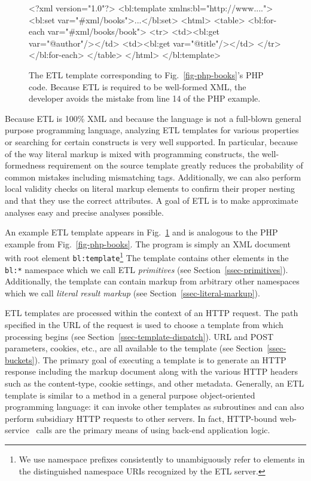 \documentclass{www2003-submission}
\newcommand{\smtexttt}[1]{{\small\texttt{#1}}}
\newcommand{\ns}[1]{{\small\texttt{#1:*}}}
\newcommand{\figref}[1]{Fig.~\ref{fig-#1}}
\newcommand{\ssecref}[1]{Section~\ref{ssec-#1}}
\begin{document}
\begin{figure}[tb]
\begin{listing}{1}
<?xml version="1.0"?>
<bl:template xmlns:bl="http://www....">
 <bl:set var="#xml/books">...</bl:set>
 <html>
  <table>
   <bl:for-each var="#xml/books/book">
    <tr> 
     <td><bl:get var="@author"/></td>
     <td><bl:get var="@title"/></td>
    </tr>
   </bl:for-each>
  </table>
 </html>
</bl:template>
\end{listing}%
\caption{The ETL template corresponding to \figref{php-books}'s PHP
code. Because ETL is required to be well-formed XML, the developer
avoids the mistake from line 14 of the PHP example.
\label{fig-etl-books}}
\end{figure}

Because ETL is 100\% XML and because the language is not a full-blown
general purpose programming language, analyzing ETL templates for
various properties or searching for certain constructs is very well
supported.  In particular, because of the way literal markup is mixed
with programming constructs, the well-formedness requirement on the
source template greatly reduces the probability of common mistakes
including mismatching tags.  Additionally, we can also perform local
validity checks on literal markup elements to confirm their proper
nesting and that they use the correct attributes.  A goal of ETL is to
make approximate analyses easy and precise analyses possible.

An example ETL template appears in \figref{etl-books} and is analogous
to the PHP example from \figref{php-books}.  The program is simply an
XML document with root element \smtexttt{bl:template}\footnote{We use
namespace prefixes consistently to unambiguously refer to elements in
the distinguished namespace URIs recognized by the ETL server.}  The
template contains other elements in the \ns{bl} namespace which we
call ETL \emph{primitives} (see \ssecref{primitives}).  Additionally,
the template can contain markup from arbitrary other namespaces which
we call \emph{literal result markup} (see \ssecref{literal-markup}).

ETL templates are processed within the context of an HTTP request.
The path specified in the URL of the request is used to choose a
template from which processing begins (see
\ssecref{template-dispatch}).  URL and POST parameters, cookies, etc.,
are all available to the template (see
\ssecref{buckets}). The primary goal of executing a template is to
generate an HTTP response including the markup document along with the
various HTTP headers such as the content-type, cookie settings, and
other metadata.  Generally, an ETL template is similar to a method in
a general purpose object-oriented programming language: it can invoke
other templates as subroutines and can also perform subsidiary HTTP
requests to other servers.  In fact, HTTP-bound
web-service~\cite{WebServices} calls are the primary means of using
back-end application logic.
\end{document}
